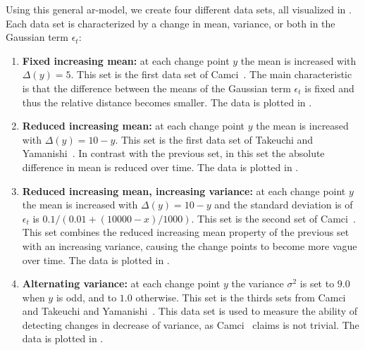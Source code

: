 Using this general \gls{ar}-model, we create four different data sets, all visualized in .
Each data set is characterized by a change in mean, variance, or both in the Gaussian term $\epsilon_t$:
\begin{enumerate}
  \item \textbf{Fixed increasing mean:} at each change point $y$ the mean is increased with $\Delta(y) = 5$.
  This set is the first data set of Camci~\cite{camci2010change}.
  The main characteristic is that the difference between the means of the Gaussian term $\epsilon_t$ is fixed and thus the relative distance becomes smaller.
  The data is plotted in .

  \item \textbf{Reduced increasing mean:} at each change point $y$ the mean is increased with $\Delta(y) = 10 - y$.
  This set is the first data set of Takeuchi and Yamanishi~\cite{takeuchi2006unifying}.
  In contrast with the previous set, in this set the absolute difference in mean is reduced over time.
  The data is plotted in .

  \item \textbf{Reduced increasing mean, increasing variance:} at each change point $y$ the mean is increased with $\Delta(y) = 10 - y$ and the standard deviation is of $\epsilon_t$ is $0.1 / (0.01 + (10000 - x)/1000)$.
  This set is the second set of Camci~\cite{camci2010change}.
  This set combines the reduced increasing mean property of the previous set with an increasing variance, causing the change points to become more vague over time.
  The data is plotted in .

  \item \textbf{Alternating variance:} at each change point $y$ the variance $\sigma^2$ is set to $9.0$ when $y$ is odd, and to $1.0$ otherwise.
  This set is the thirds sets from Camci~\cite{camci2010change} and Takeuchi and Yamanishi~\cite{takeuchi2006unifying}.
  This data set is used to measure the ability of detecting changes in decrease of variance, as Camci~\cite{camci2010change} claims is not trivial.
  The data is plotted in .
\end{enumerate}


